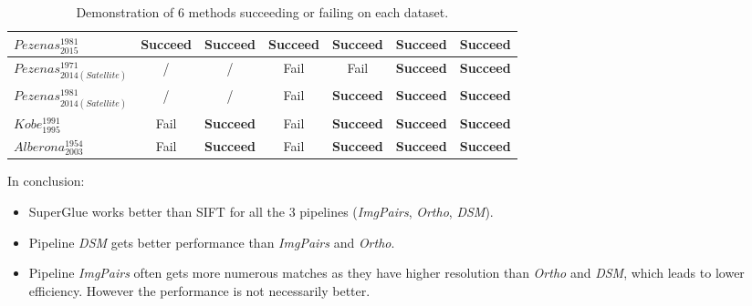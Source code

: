 \begin{table}[htbp]
\begin{tabular}{||l|c|c|c|c|c|c||}
$Pezenas_{2015}^{1981}$ &  \textbf{Succeed}  &  \textbf{Succeed}  &  \textbf{Succeed}  &  \textbf{Succeed}  &  \textbf{Succeed}  &  \textbf{Succeed} \\\hline
$Pezenas_{2014(Satellite)}^{1971}$ & / & / &  Fail  &  Fail  &  \textbf{Succeed}  &  \textbf{Succeed} \\
$Pezenas_{2014(Satellite)}^{1981}$ & / & / &  Fail  &  \textbf{Succeed}  &  \textbf{Succeed}  &  \textbf{Succeed} \\\hline
$Kobe_{1995}^{1991}$ &  Fail  &  \textbf{Succeed}  &  Fail  &  \textbf{Succeed}  &  \textbf{Succeed}  &  \textbf{Succeed} \\\hline
$Alberona_{2003}^{1954}$ &  Fail  &  \textbf{Succeed}  &  Fail  &  \textbf{Succeed}  &  \textbf{Succeed}  &  \textbf{Succeed} \\\hline
	\end{tabular}
	\caption{Demonstration of 6 methods succeeding or failing on each dataset.}
	\label{succeedorfail}
\end{table}

In conclusion:\\
\begin{itemize}
	\item SuperGlue works better than SIFT for all the 3 pipelines (\textit{ImgPairs}, \textit{Ortho}, \textit{DSM}). 
	\item Pipeline \textit{DSM} gets better performance than \textit{ImgPairs} and \textit{Ortho}.
	\item Pipeline \textit{ImgPairs} often gets more numerous matches as they have higher resolution than \textit{Ortho} and \textit{DSM}, which leads to lower efficiency. However the performance is not necessarily better.
\end{itemize}


